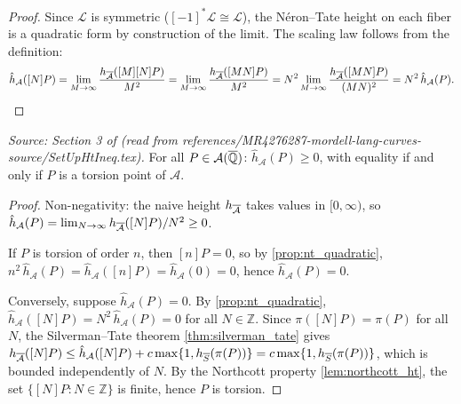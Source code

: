 \begin{proof}
  Since \(\mathcal{L}\) is symmetric (\([-1]^*\mathcal{L} \cong \mathcal{L}\)), the
  Néron--Tate height on each fiber is a quadratic form by construction of the limit.
  The scaling law follows from the definition:
  \[
    \hat{h}_{\mathcal{A}}([N]P)
    = \lim_{M \to \infty} \frac{h_{\overline{\mathcal{A}}}([M][N]P)}{M^2}
    = \lim_{M \to \infty} \frac{h_{\overline{\mathcal{A}}}([MN]P)}{M^2}
    = N^2 \lim_{M \to \infty} \frac{h_{\overline{\mathcal{A}}}([MN]P)}{(MN)^2}
    = N^2\,\hat{h}_{\mathcal{A}}(P). \qedhere
  \]
\end{proof}

\begin{proposition}
  \label{prop:nt_nonneg}
  \textit{Source: Section 3 of \cite{MR4276287-mordell-lang-curves} (read from references/MR4276287-mordell-lang-curves-source/SetUpHtIneq.tex).}
  For all \(P \in \mathcal{A}(\overline{\mathbb{Q}})\):
  \(\hat{h}_{\mathcal{A}}(P) \ge 0\), with equality if and only if
  \(P\) is a torsion point of \(\mathcal{A}\).
\end{proposition}

\begin{proof}
  Non-negativity: the naive height \(h_{\overline{\mathcal{A}}}\) takes values in \([0,\infty)\), so
  \(\hat{h}_{\mathcal{A}}(P) = \lim_{N\to\infty}h_{\overline{\mathcal{A}}}([N]P)/N^2 \ge 0\).

  If \(P\) is torsion of order \(n\), then \([n]P = 0\), so by
  \cref{prop:nt_quadratic}, \(n^2\,\hat{h}_{\mathcal{A}}(P) =
  \hat{h}_{\mathcal{A}}([n]P) = \hat{h}_{\mathcal{A}}(0) = 0\),
  hence \(\hat{h}_{\mathcal{A}}(P) = 0\).

  Conversely, suppose \(\hat{h}_{\mathcal{A}}(P) = 0\). By
  \cref{prop:nt_quadratic}, \(\hat{h}_{\mathcal{A}}([N]P) = N^2\,\hat{h}_{\mathcal{A}}(P) = 0\)
  for all \(N \in \mathbb{Z}\). Since \(\pi([N]P) = \pi(P)\) for all \(N\),
  the Silverman--Tate theorem \cref{thm:silverman_tate} gives
  \(h_{\overline{\mathcal{A}}}([N]P) \le \hat{h}_{\mathcal{A}}([N]P) + c\max\{1,h_{\overline{S}}(\pi(P))\}
  = c\max\{1,h_{\overline{S}}(\pi(P))\}\),
  which is bounded independently of \(N\). By the Northcott property
  \cref{lem:northcott_ht}, the set \(\{[N]P : N \in \mathbb{Z}\}\) is finite,
  hence \(P\) is torsion.
\end{proof}

